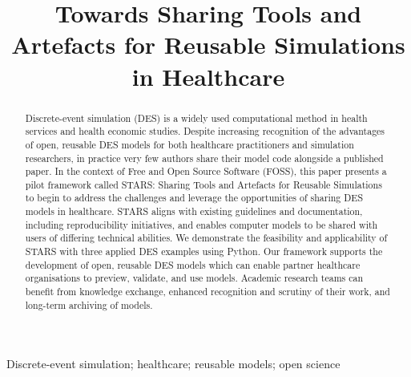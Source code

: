\documentclass[]{interact}
\theoremstyle{plain}%
\theoremstyle{definition}
\theoremstyle{remark}
\begin{document}

\title{Towards Sharing Tools and Artefacts for Reusable Simulations in Healthcare} %
\author{
}

\author{
}



\maketitle

\newpage

\begin{abstract}
Discrete-event simulation (DES) is a widely used computational method in health services and health economic studies. Despite increasing recognition of the advantages of open, reusable DES models for both healthcare practitioners and simulation researchers, in practice very few authors share their model code alongside a published paper. In the context of Free and Open Source Software (FOSS), this paper presents a pilot framework called STARS: Sharing Tools and Artefacts for Reusable Simulations to begin to address the challenges and leverage the opportunities of sharing DES models in healthcare. STARS aligns with existing guidelines and documentation, including reproducibility initiatives, and enables computer models to be shared with users of differing technical abilities.  We demonstrate the feasibility and applicability of STARS with three applied DES examples using Python. Our framework supports the development of open, reusable DES models which can enable partner healthcare organisations to preview, validate, and use models. Academic research teams can benefit from knowledge exchange, enhanced recognition and scrutiny of their work, and long-term archiving of models.
\end{abstract}

\begin{keywords}
Discrete-event simulation; healthcare; reusable models; open science
\end{keywords}
\end{document}
